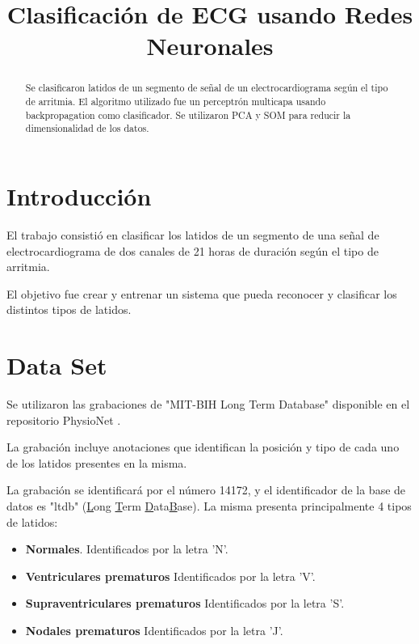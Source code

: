 \documentclass[conference]{IEEEtran}
\theoremstyle{definition}
\begin{document}
\title{Clasificación de ECG usando Redes Neuronales}

\author{
	}
\maketitle


\begin{abstract}
	Se clasificaron latidos de un segmento de señal de un electrocardiograma según el tipo de arritmia. El algoritmo utilizado fue un perceptrón multicapa usando backpropagation como clasificador. Se utilizaron PCA y SOM para reducir la dimensionalidad de los datos.
\end{abstract}

\section{Introducci\'{o}n}

El trabajo consistió en clasificar los latidos de un segmento de una señal de electrocardiograma de dos canales de 21 horas de duración según el tipo de arritmia.

El objetivo fue crear y entrenar un sistema que pueda reconocer y clasificar los distintos tipos de latidos.

\section{Data Set}

Se utilizaron las grabaciones de "MIT-BIH Long Term Database" \cite{MIT-BIH} disponible en el repositorio PhysioNet \cite{PHYSIONET}.

La grabación incluye anotaciones que identifican la posición y tipo de cada uno de los latidos presentes en la misma.

La grabación se identificará por el número 14172, y el identificador de la base de datos es "ltdb" (\underline{L}ong \underline{T}erm \underline{D}ata\underline{B}ase).
La misma presenta principalmente 4 tipos de latidos:

\begin{itemize}
	\item \textbf{Normales}. Identificados por la letra 'N'.
	\item \textbf{Ventriculares prematuros} Identificados por la letra 'V'.
	\item \textbf{Supraventriculares prematuros} Identificados por la letra 'S'.
	\item \textbf{Nodales prematuros} Identificados por la letra 'J'.
\end{itemize}
\end{document}
